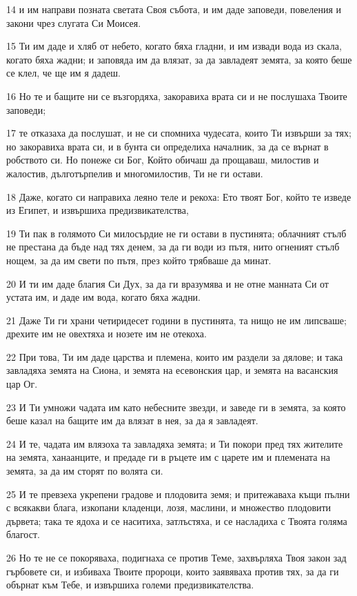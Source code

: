 \par 14 и им направи позната светата Своя събота, и им даде заповеди, повеления и закони чрез слугата Си Моисея.
\par 15 Ти им даде и хляб от небето, когато бяха гладни, и им извади вода из скала, когато бяха жадни; и заповяда им да влязат, за да завладеят земята, за която беше се клел, че ще им я дадеш.
\par 16 Но те и бащите ни се възгордяха, закоравиха врата си и не послушаха Твоите заповеди;
\par 17 те отказаха да послушат, и не си спомниха чудесата, които Ти извърши за тях; но закоравиха врата си, и в бунта си определиха началник, за да се върнат в робството си. Но понеже си Бог, Който обичаш да прощаваш, милостив и жалостив, дълготърпелив и многомилостив, Ти не ги остави.
\par 18 Даже, когато си направиха леяно теле и рекоха: Ето твоят Бог, който те изведе из Египет, и извършиха предизвикателства,
\par 19 Ти пак в голямото Си милосърдие не ги остави в пустинята; облачният стълб не престана да бъде над тях денем, за да ги води из пътя, нито огненият стълб нощем, за да им свети по пътя, през който трябваше да минат.
\par 20 И ти им даде благия Си Дух, за да ги вразумява и не отне манната Си от устата им, и даде им вода, когато бяха жадни.
\par 21 Даже Ти ги храни четиридесет години в пустинята, та нищо не им липсваше; дрехите им не овехтяха и нозете им не отекоха.
\par 22 При това, Ти им даде царства и племена, които им раздели за дялове; и така завладяха земята на Сиона, и земята на есевонския цар, и земята на васанския цар Ог.
\par 23 И Ти умножи чадата им като небесните звезди, и заведе ги в земята, за която беше казал на бащите им да влязат в нея, за да я завладеят.
\par 24 И те, чадата им влязоха та завладяха земята; и Ти покори пред тях жителите на земята, ханаанците, и предаде ги в ръцете им с царете им и племената на земята, за да им сторят по волята си.
\par 25 И те превзеха укрепени градове и плодовита земя; и притежаваха къщи пълни с всякакви блага, изкопани кладенци, лозя, маслини, и множество плодовити дървета; така те ядоха и се наситиха, затлъстяха, и се насладиха с Твоята голяма благост.
\par 26 Но те не се покоряваха, подигнаха се против Теме, захвърляха Твоя закон зад гърбовете си, и избиваха Твоите пророци, които заявяваха против тях, за да ги обърнат към Тебе, и извършиха големи предизвикателства.

